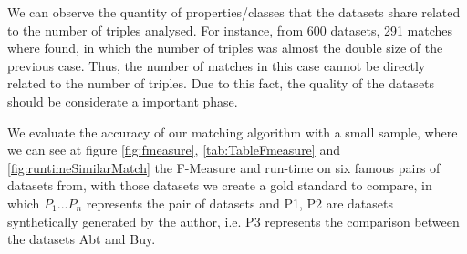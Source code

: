 We can observe the quantity of properties/classes that the datasets share related to the number of triples analysed. For instance, from 600 datasets, 291 matches where found, in which the number of triples was almost the double size of the previous case. Thus, the number of matches in this case cannot be directly related to the number of triples. Due to this fact, the quality of the datasets should be considerate a important phase.

We evaluate the accuracy of our matching algorithm with a small sample, where we can see at figure \ref{fig:fmeasure}, \ref{tab:TableFmeasure} and \ref{fig:runtimeSimilarMatch} the F-Measure and run-time on six famous pairs of datasets from\cite{georgala2018dynamic}, with those datasets we create a gold standard to compare, in which $P_1...P_n$ represents the pair of datasets and P1, P2 are datasets synthetically generated by the author, i.e. P3 represents the comparison between the datasets Abt and Buy.

